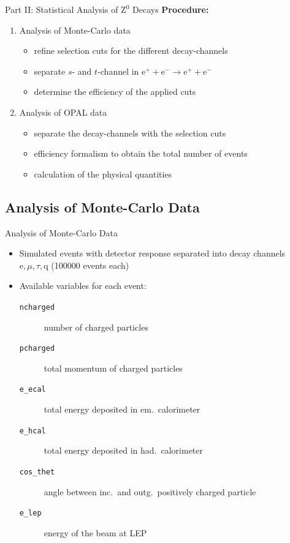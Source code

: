 \documentclass[11pt,xcolor=dvipsnames,professionalfonts]{beamer}
\begin{document}
\begin{frame}{Part II: Statistical Analysis of $\mathrm{Z}^0$ Decays}
	\textbf{Procedure:}
	\begin{enumerate}
		\setlength\itemsep{2.em}
		\item Analysis of Monte-Carlo data
		\begin{itemize}
			\setlength\itemsep{0.5em}
			\item refine selection cuts for the different decay-channels
			
			\item separate $s$- and $t$-channel in $\mathrm{e}^+ + \mathrm{e}^- \rightarrow \mathrm{e}^+ + \mathrm{e}^-$
			
			\item determine the efficiency of the applied cuts
		\end{itemize}
		
		\item Analysis of OPAL data
		\begin{itemize}
			\setlength\itemsep{0.5em}
			\item separate the decay-channels with the selection cuts
			
			\item efficiency formalism to obtain the total number of events
			
			\item calculation of the physical quantities
		\end{itemize}
	\end{enumerate}
\end{frame}

\subsection{Analysis of Monte-Carlo Data}

\begin{frame}{Analysis of Monte-Carlo Data}
	\begin{itemize}
		\setlength\itemsep{2.em}
		\item Simulated events with detector response separated into decay channels $\mathrm{e}, \mu, \tau, \mathrm{q}$ (\num{100000} events each)
		
		\item Available variables for each event:
		\begin{description}
			\item[\texttt{ncharged}] number of charged particles
			\item[\texttt{pcharged}] total momentum of charged particles
			\item[\texttt{e\_ecal}] total energy deposited in em.\ calorimeter
			\item[\texttt{e\_hcal}] total energy deposited in had.\ calorimeter
			\item[\texttt{cos\_thet}] angle between inc.\ and outg.\ positively charged particle
			\item[\texttt{e\_lep}] energy of the beam at LEP
		\end{description}
	\end{itemize}
\end{frame}
\end{document}
